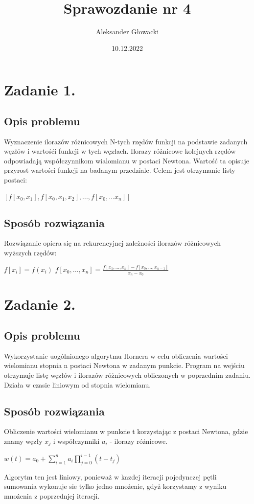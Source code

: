 \documentclass[12pt]{article}
\author{Aleksander Głowacki}
\title{Sprawozdanie nr 4}
\date{10.12.2022}
\begin{document}
\maketitle

\tableofcontents

\section{Zadanie 1.}


\subsection{Opis problemu}
Wyznaczenie ilorazów różnicowych N-tych rzędów funkcji na podstawie zadanych węzłów i wartośći funkcji w tych węzłach.
Ilorazy różnicowe kolejnych rzędów odpowiadają współczynnikom wialomianu w postaci Newtona.
Wartość ta opisuje przyrost wartości funkcji na badanym przedziale.
Celem jest otrzymanie listy postaci:
\begin{center}
    $[f[x_0,x_1], f[x_0,x_1,x_2],...,f[x_0,...x_n]]$
\end{center} 
\subsection{Sposób rozwiązania}
Rozwiązanie opiera się na rekurencyjnej zależności ilorazów różnicowych wyższych rzędów:
\begin{center}
    $f[x_i] = f(x_i)$ \newline
    $f[x_0,...,x_n] = \frac{f[x_1,...,x_n] - f[x_0,...,x_{n-1}]}{x_n - x_0}$
\end{center}

\section{Zadanie 2.}

\subsection{Opis problemu}

Wykorzystanie uogólnionego algorytmu Hornera w celu obliczenia wartości wielomianu stopnia n postaci Newtona w zadanym punkcie.
Program na wejściu otrzymuje listę węzłów i ilorazów różnicowych obliczonych w poprzednim zadaniu. Działa w czasie liniowym od stopnia wielomianu.
\subsection{Sposób rozwiązania}
Obliczenie wartości wielomianu w punkcie t korzystając z postaci Newtona, gdzie znamy węzły $x_j$ i współczynniki $a_i$ - ilorazy różnicowe.
\begin{center}
    $w(t) = a_0 + \sum_{i = 1}^{n} a_i \prod_{j = 0}^{i-1} (t - t_j)$
\end{center}
Algorytm ten jest liniowy, ponieważ w kazdej iteracji pojedynczej pętli sumowania wykonuje sie tylko jedno mnożenie, gdyż korzystamy z wyniku mnożenia z poprzednjej iteracji.
\end{document}
